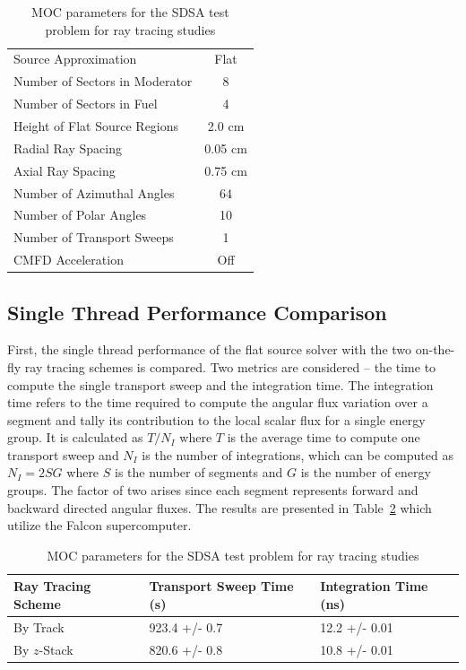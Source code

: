 \begin{table}[ht]
	\centering
	\caption{MOC parameters for the SDSA test problem for ray tracing studies}
	\medskip
	\begin{tabular}{lc}
		\hline
		Source Approximation & Flat \\
		Number of Sectors in Moderator & 8 \\
		Number of Sectors in Fuel & 4 \\
		Height of Flat Source Regions & 2.0 cm \\
		Radial Ray Spacing & 0.05 cm \\
		Axial Ray Spacing & 0.75 cm \\
		Number of Azimuthal Angles & 64 \\
		Number of Polar Angles & 10 \\
		Number of Transport Sweeps & 1 \\
		CMFD Acceleration & Off \\
		\hline
	\end{tabular}
	\label{tab:sdsa-rt-flat}
\end{table}

\subsection{Single Thread Performance Comparison}

First, the single thread performance of the flat source solver with the two on-the-fly ray tracing schemes is compared. Two metrics are considered -- the time to compute the single transport sweep and the integration time. The integration time refers to the time required to compute the angular flux variation over a segment and tally its contribution to the local scalar flux for a single energy group. It is calculated as $T / N_I$ where $T$ is the average time to compute one transport sweep and $N_I$ is the number of integrations, which can be computed as $N_I = 2 S G$ where $S$ is the number of segments and $G$ is the number of energy groups. The factor of two arises since each segment represents forward and backward directed angular fluxes. The results are presented in Table~\ref{tab:rt-single-thread} which utilize the Falcon supercomputer.

\begin{table}[ht]
	\centering
	\caption{MOC parameters for the SDSA test problem for ray tracing studies}
	\medskip
	\begin{tabular}{l|l|l}
		\hline
	    Ray Tracing Scheme & Transport Sweep Time (s) & Integration Time (ns) \\
		\hline
		By Track & 923.4 +/- 0.7 & 12.2 +/- 0.01 \\
		By $z$-Stack & 820.6 +/- 0.8 & 10.8 +/- 0.01 \\
		\hline
	\end{tabular}
	\label{tab:rt-single-thread}
\end{table}

